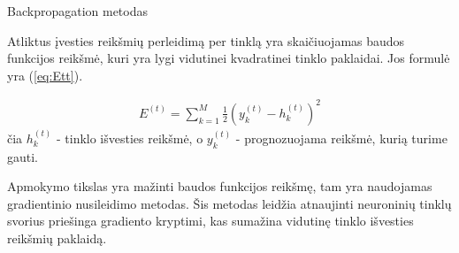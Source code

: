 Backpropagation metodas

Atliktus įvesties reikšmių perleidimą per tinklą yra skaičiuojamas baudos funkcijos reikšmė, kuri yra lygi vidutinei kvadratinei tinklo paklaidai. Jos formulė yra (\ref{eq:Ett}).

%

\begin{equation} \label{eq:Ett}
  \begin{aligned}
  E^{(t)} = \sum_{k=1}^{M} \frac{1}{2}(y_k^{(t)} - h_k^{(t)})^{2}
  \end{aligned}
\end{equation}
čia \begin{math}h_k^{(t)}\end{math} - tinklo išvesties reikšmė, o \begin{math}y_k^{(t)}\end{math} - prognozuojama reikšmė, kurią turime gauti.

Apmokymo tikslas yra mažinti baudos funkcijos reikšmę, tam yra naudojamas gradientinio nusileidimo metodas. Šis metodas leidžia atnaujinti neuroninių tinklų svorius priešinga gradiento kryptimi, kas sumažina vidutinę tinklo išvesties reikšmių paklaidą.

